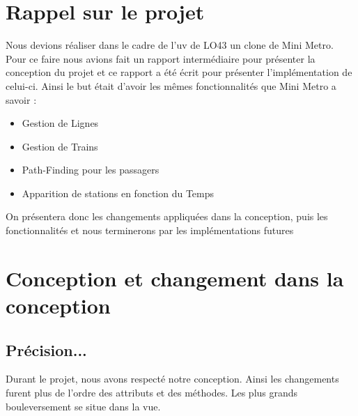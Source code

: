 \documentclass[report, backcover, french, nodocumentinfo]{upmethodology-document}
\begin{document}
	\upmdocumentsummary{}
	\upmdocumentauthors{}
	\upmdocumentinformedpeople{}
	\upmpublicationpage{}

	\tableofcontents{}
	\listoffigures{}

	\newpage{}
	\chapter{Rappel sur le projet}
		\p{}
			Nous devions réaliser dans le cadre de l'uv de LO43 un clone de Mini Metro. Pour ce faire nous avions fait un rapport intermédiaire pour présenter la conception du projet et ce rapport a été écrit pour présenter l'implémentation de celui-ci. Ainsi le but était d'avoir les mêmes fonctionnalités que Mini Metro a savoir :
			\begin{itemize}
				\item Gestion de Lignes
				\item Gestion de Trains
				\item Path-Finding pour les passagers
				\item Apparition de stations en fonction du Temps
			\end{itemize}
			On présentera donc les changements appliquées dans la conception, puis les fonctionnalités et nous terminerons par les implémentations futures
	\chapter{Conception et changement dans la conception}
		\section{Précision...}
			\p{}
			Durant le projet, nous avons respecté notre conception. Ainsi les changements furent plus de l'ordre des attributs et des méthodes. Les plus grands bouleversement se situe dans la vue.
\end{document}
